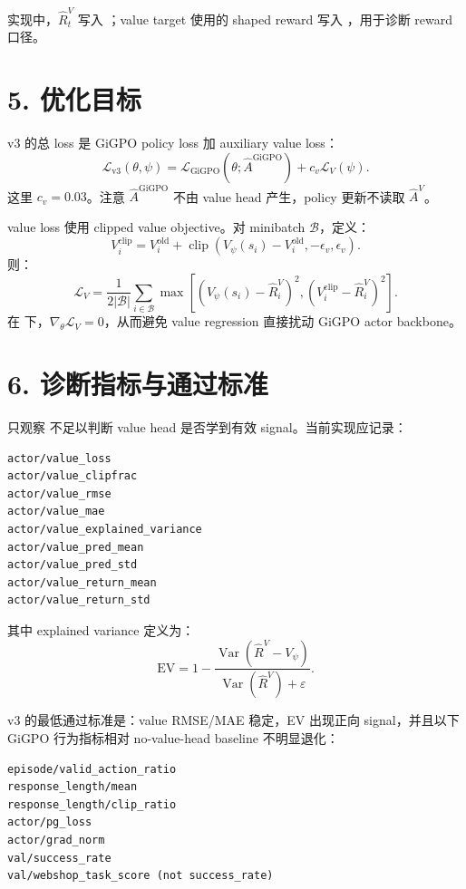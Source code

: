 \documentclass[10pt]{ctexart}
\newcommand{\clip}{\operatorname{clip}}
\newcommand{\Var}{\operatorname{Var}}
\begin{document}
实现中，\(\widehat R_t^V\) 写入 ；value target 使用的 shaped reward 写入 ，用于诊断 reward 口径。

\section*{5. 优化目标}
v3 的总 loss 是 GiGPO policy loss 加 auxiliary value loss：
\[
\mathcal{L}_{\mathrm{v3}}(\theta,\psi)
= \mathcal{L}_{\mathrm{GiGPO}}(\theta; \widehat A^{\mathrm{GiGPO}})
+ c_v\mathcal{L}_V(\psi).
\]
这里 \(c_v=0.03\)。注意 \(\widehat A^{\mathrm{GiGPO}}\) 不由 value head 产生，policy 更新不读取 \(\widehat A^V\)。

value loss 使用 clipped value objective。对 minibatch \(\mathcal{B}\)，定义：
\[
V_i^{\mathrm{clip}}
= V_i^{\mathrm{old}} + \clip\left(V_\psi(s_i)-V_i^{\mathrm{old}}, -\epsilon_v, \epsilon_v\right).
\]
则：
\[
\mathcal{L}_V
= \frac{1}{2|\mathcal{B}|}\sum_{i\in\mathcal{B}}
\max\left[
\left(V_\psi(s_i)-\widehat R_i^V\right)^2,
\left(V_i^{\mathrm{clip}}-\widehat R_i^V\right)^2
\right].
\]
在  下，\(\nabla_\theta \mathcal{L}_V=0\)，从而避免 value regression 直接扰动 GiGPO actor backbone。

\section*{6. 诊断指标与通过标准}
只观察  不足以判断 value head 是否学到有效 signal。当前实现应记录：
\begin{lstlisting}
actor/value_loss
actor/value_clipfrac
actor/value_rmse
actor/value_mae
actor/value_explained_variance
actor/value_pred_mean
actor/value_pred_std
actor/value_return_mean
actor/value_return_std
\end{lstlisting}
其中 explained variance 定义为：
\[
\mathrm{EV}=1-\frac{\Var(\widehat R^V - V_\psi)}{\Var(\widehat R^V)+\varepsilon}.
\]

v3 的最低通过标准是：value RMSE/MAE 稳定，EV 出现正向 signal，并且以下 GiGPO 行为指标相对 no-value-head baseline 不明显退化：
\begin{lstlisting}
episode/valid_action_ratio
response_length/mean
response_length/clip_ratio
actor/pg_loss
actor/grad_norm
val/success_rate
val/webshop_task_score (not success_rate)
\end{lstlisting}
\end{document}
